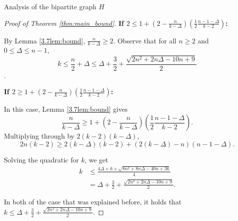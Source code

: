 \documentclass[11pt, letterpaper]{article}
\theoremstyle{plain}
\theoremstyle{plain}
\begin{document}
\begin{section}{Analysis of the bipartite graph $H$}
\begin{proof}[Proof of Theorem \ref{thm:main_bound}]
   \medskip

   
   \noindent\textbf{If $2 \leq 1+\left(2-\frac{n}{k-\Delta}\right)\left(\frac{1}{2}\frac{n-1-\Delta}{k-2}\right)$: } 

   
    By Lemma \ref{3.7lem:bound}, $\frac n {k-\Delta} \geq 2$. Observe that for all $n \geq 2$ and $0 \leq \Delta \leq n-1$, 
$$ k \leq \frac{n}{2} + \Delta \leq  \Delta+\frac{3}{2}+ \frac{\sqrt{2n^{2}+2n\Delta-10n+9}}{2}$$. %
    
   
   
    \noindent\textbf{If $ 2 \geq 1+\left(2-\frac{n}{k-\Delta}\right)\left(\frac{1}{2}\frac{n-1-\Delta}{k-2}\right) $:} 
    
    In this case, Lemma \ref{3.7lem:bound} gives
    $$\frac{n}{k-\Delta}\geq  1+\left(2-\frac{n}{k-\Delta}\right)\left(\frac{1}{2}\frac{n-1-\Delta}{k-2}\right).$$
    Multiplying through by $2(k-2)(k-\Delta)$, $$2n(k-2) \geq 2(k-\Delta)(k-2) + (2(k-\Delta) -n)(n-1-\Delta).$$ 

    Solving the quadratic for $k$, we get
    \begin{align*}
         k &\leq \frac{4\Delta+6+\sqrt{8n^{2}+8n\Delta-40n+36}}{4}
         \\ &= \Delta+\frac{3}{2}+ \frac{\sqrt{2n^{2}+2n\Delta-10n+9}}{2}.
    \end{align*}
    
\medskip
In both  of the case that was explained before, it holds that $k\leq \Delta+\frac{3}{2}+ \frac{\sqrt{2n^{2}+2n\Delta-10n+9}}{2}.$


\end{proof}
\end{section}
\end{document}
